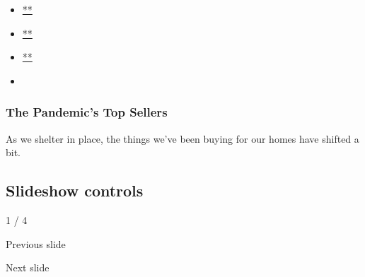 \begin{itemize}
\item
  \href{https://www.facebook.com/sharer.php?app_id=9869919170\&u=https\%3A\%2F\%2Fwww.nytimes.com\%2Fslideshow\%2F2020\%2F07\%2F31\%2Frealestate\%2Fthe-pandemics-top-sellers.html\%3Fsmid\%3Dfb-share\&name=The\%20Pandemic\%E2\%80\%99s\%20Top\%20Sellers\&redirect_uri=https\%3A\%2F\%2Fwww.facebook.com\%2F}{**}
\item
  \href{https://twitter.com/intent/tweet?url=https\%3A\%2F\%2Fwww.nytimes.com\%2Fslideshow\%2F2020\%2F07\%2F31\%2Frealestate\%2Fthe-pandemics-top-sellers.html\%3Fsmid\%3Dtw-share\&text=The\%20Pandemic\%E2\%80\%99s\%20Top\%20Sellers}{**}
\item
  \href{mailto:?subject=NYTimes.com\%3A\%20The\%20Pandemic\%E2\%80\%99s\%20Top\%20Sellers\&body=From\%20The\%20New\%20York\%20Times\%3A\%0A\%0AThe\%20Pandemic\%E2\%80\%99s\%20Top\%20Sellers\%0A\%0AAs\%20we\%20shelter\%20in\%20place\%2C\%20the\%20things\%20we\%E2\%80\%99ve\%20been\%20buying\%20for\%20our\%20homes\%20have\%20shifted\%20a\%20bit.\%0A\%0Ahttps\%3A\%2F\%2Fwww.nytimes.com\%2Fslideshow\%2F2020\%2F07\%2F31\%2Frealestate\%2Fthe-pandemics-top-sellers.html\%3Fsmid\%3Dem-share}{**}
\item
\end{itemize}

\hypertarget{the-pandemics-top-sellers-1}{%
\subsubsection{The Pandemic's Top
Sellers}\label{the-pandemics-top-sellers-1}}

As we shelter in place, the things we've been buying for our homes have
shifted a bit.

\hypertarget{slideshow-controls}{%
\subsection{Slideshow controls}\label{slideshow-controls}}

1 / 4

Previous slide

Next slide
